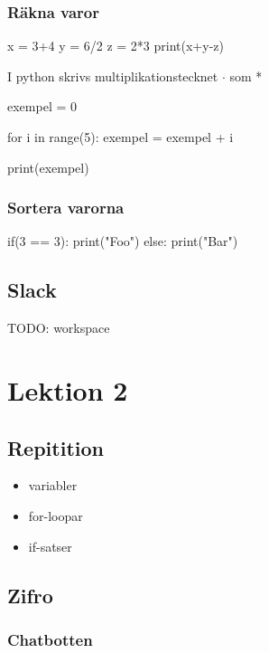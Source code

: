 \documentclass{article}%
\begin{document}
\subsubsection{Räkna varor}

\begin{python}[language=Python, caption=Variabler] 
x = 3+4 
y = 6/2
z = 2*3
print(x+y-z)
\end{python}

\Large I python skrivs multiplikationstecknet \textbf{$\cdot$} som * \hfill
\normalsize

\begin{python}[language=Python, caption=Ökad mängd] 
exempel = 0

for i in range(5):
    exempel = exempel + i

print(exempel)
\end{python}

\subsubsection{Sortera varorna}

\begin{python}[language=Python, caption=if-satser]
if(3 == 3):
    print("Foo")
else:
    print("Bar")
\end{python}

\subsection{Slack}
TODO: workspace


\section{Lektion 2}
\subsection{Repitition}
\begin{itemize}
\item variabler
\item for-loopar
\item if-satser
\end{itemize}

\subsection{Zifro}
\subsubsection{Chatbotten}
\end{document}
